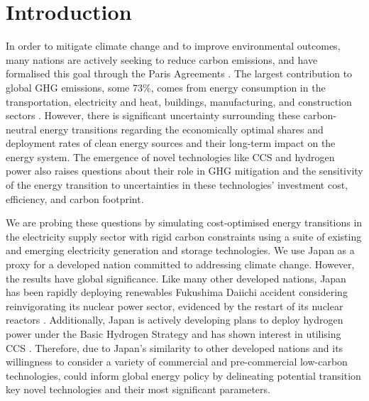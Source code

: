 \section{Introduction} \label{Introduction}
In order to mitigate climate change and to improve environmental outcomes, many nations are actively seeking to reduce carbon emissions, and have formalised this goal through the Paris Agreements \mbox{\cite{united_nations_framework_convention_on_climate_change_unfccc_submission_2015}}. The largest contribution to global \gls{GHG} emissions, some 73\%, comes from energy consumption in the transportation, electricity and heat, buildings, manufacturing, and construction sectors \mbox{\cite{ge_4_2020}}. However, there is significant uncertainty surrounding these carbon-neutral energy transitions regarding the economically optimal shares and deployment rates of clean energy sources and their long-term impact on the energy system. The emergence of novel technologies like  \gls{CCS}  and hydrogen power also raises questions about their role in \gls{GHG} mitigation and the sensitivity of the energy transition to uncertainties in these technologies' investment cost, efficiency, and carbon footprint.

We are probing these questions by simulating cost-optimised energy transitions in the electricity supply sector with rigid carbon constraints using a suite of existing and emerging electricity generation and storage technologies. We use Japan as a proxy for a developed nation committed to addressing climate change. However, the results have global significance. Like many other developed nations, Japan has been rapidly deploying renewables  Fukushima Daiichi accident  considering reinvigorating its nuclear power sector, evidenced by the restart of its nuclear reactors \mbox{\cite{iaea_pris_nodate}}. Additionally, Japan is actively developing plans to deploy hydrogen power under the Basic Hydrogen Strategy \mbox{\cite{meti_basic_2017}} and has shown interest in utilising \gls{CCS} \mbox{\cite{meti_report_2020}}. Therefore, due to Japan's similarity to other developed nations and its willingness to consider a variety of commercial and pre-commercial low-carbon technologies,   could inform global energy policy by delineating potential transition   key novel technologies \deleted{, } and their most significant parameters.

